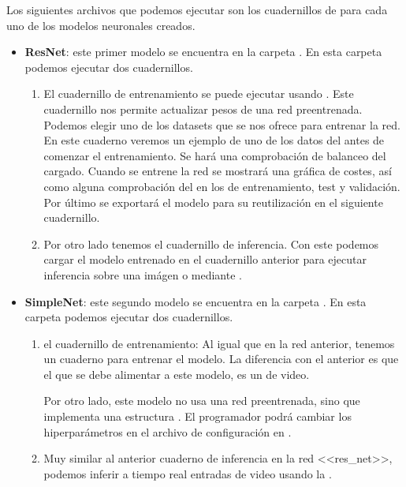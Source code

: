 Los siguientes archivos que podemos ejecutar son los cuadernillos de  para cada uno de los modelos neuronales creados.

\begin{itemize}
  \item \textbf{ResNet}: este primer modelo se encuentra en la carpeta . En esta carpeta podemos ejecutar dos cuadernillos.

        \begin{enumerate}
          \item El cuadernillo de entrenamiento se puede ejecutar usando . Este cuadernillo nos permite actualizar pesos de una red preentrenada. Podemos elegir uno de los datasets que se nos ofrece para entrenar la red. En este cuaderno veremos un ejemplo de uno de los datos del  antes de comenzar el entrenamiento. Se hará una comprobación de balanceo del  cargado. Cuando se entrene la red se mostrará una gráfica de costes, así como alguna comprobación del  en los  de entrenamiento, test y validación. Por último se exportará el modelo para su reutilización en el siguiente cuadernillo.

          \item Por otro lado tenemos el cuadernillo de inferencia. Con este podemos cargar el modelo entrenado en el cuadernillo anterior para ejecutar inferencia sobre una imágen o mediante .
        \end{enumerate}

  \item \textbf{SimpleNet}: este segundo modelo se encuentra en la carpeta . En esta carpeta podemos ejecutar dos cuadernillos.

        \begin{enumerate}
          \item el cuadernillo de entrenamiento: Al igual que en la red anterior, tenemos un cuaderno para entrenar el modelo. La diferencia con el anterior es que el  que se debe alimentar a este modelo, es un  de video.

                Por otro lado, este modelo no usa una red preentrenada, sino que implementa una estructura . El programador podrá cambiar los hiperparámetros en el archivo de configuración en .

          \item Muy similar al anterior cuaderno de inferencia en la red <<res\_net>>, podemos inferir a tiempo real entradas de video usando la .
        \end{enumerate}


\end{itemize}
